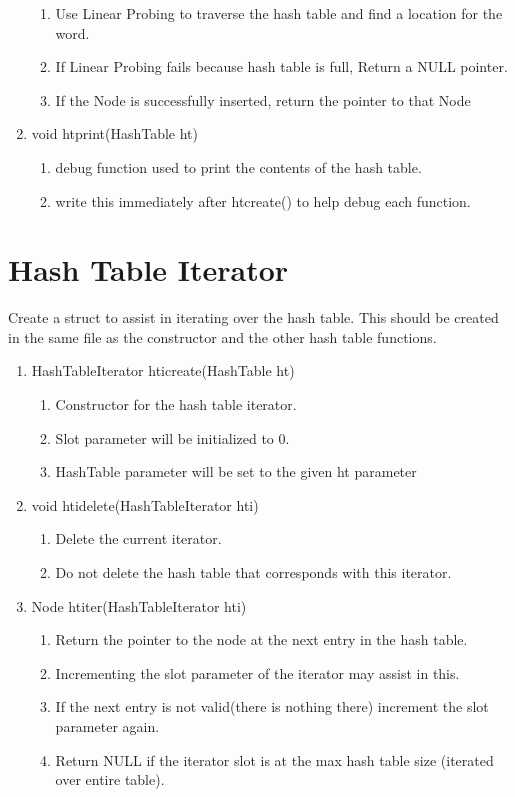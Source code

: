 \documentclass[11pt]{article}
\begin{document}
\begin{enumerate}
\begin{enumerate}
	\item Use Linear Probing to traverse the hash table and find a location for the word.
	\item If Linear Probing fails because hash table is full, Return a NULL pointer.
	\item If the Node is successfully inserted, return the pointer to that Node
	\end{enumerate}
\item void htprint(HashTable ht)
	\begin{enumerate}
	\item debug function used to print the contents of the hash table.
	\item write this immediately after htcreate() to help debug each function.
	\end{enumerate}
\end{enumerate}

\section{Hash Table Iterator}\label{ss:iterator}
Create a struct to assist in iterating over the hash table. This should be created in the same file as the constructor and the other hash table functions.
\begin{enumerate}
\item HashTableIterator hticreate(HashTable ht)
	\begin{enumerate}
	\item Constructor for the hash table iterator.
	\item Slot parameter will be initialized to 0.
	\item HashTable parameter will be set to the given ht parameter
	\end{enumerate}
\item void htidelete(HashTableIterator hti)
	\begin{enumerate}
	\item Delete the current iterator.
	\item Do not delete the hash table that corresponds with this iterator.
	\end{enumerate}
\item Node htiter(HashTableIterator hti)
	\begin{enumerate}
	\item Return the pointer to the node at the next entry in the hash table.
	\item Incrementing the slot parameter of the iterator may assist in this.
	\item If the next entry is not valid(there is nothing there) increment the slot parameter again.
	\item Return NULL if the iterator slot is at the max hash table size (iterated over entire table).
	\end{enumerate}
\end{enumerate}
\end{document}
